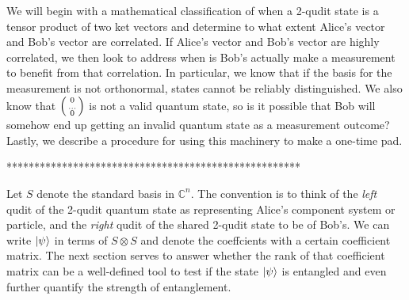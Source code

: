 We will begin with a mathematical classification of when a 2-qudit state is a tensor product of two ket vectors and determine to what extent Alice's vector and Bob's vector are correlated. If Alice's vector and Bob's vector are highly correlated, we then look to address when is Bob's actually make a measurement to benefit from that correlation. In particular, we know that if the basis for the measurement is not orthonormal, states cannot be reliably distinguished. We also know that $\left(\begin{smallmatrix}0\\ \hdots \\0\end{smallmatrix}\right)$ is not a valid quantum state, so is it possible that Bob will somehow end up getting an invalid quantum state as a measurement outcome? 
Lastly, we describe a procedure for using this machinery to make a one-time pad.

*****************************************************


Let $S$ denote the standard basis in $\mathbb{C}^n$. The convention is to think of the \textit{left} qudit of the 2-qudit quantum state as representing Alice's component system or particle, and the \textit{right} qudit of the shared 2-qudit state to be of Bob's. We can write $\ket{\psi}$ in terms of $S \otimes S$ and denote the coeffcients with a certain coefficient matrix. The next section serves to answer whether the rank of that coefficient matrix can be a well-defined tool to test if the state $\ket{\psi}$ is entangled and even further quantify the strength of entanglement.


